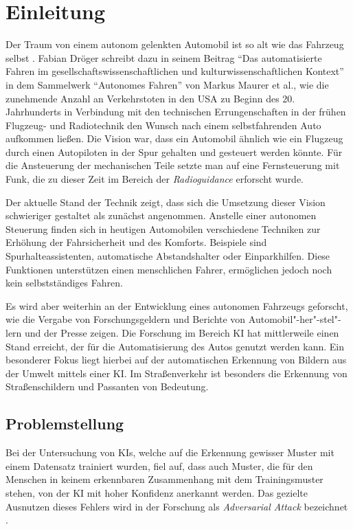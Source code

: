 \chapter{Einleitung}
\label{cha:Einleitung}
\setlength{\epigraphwidth}{4in}

Der Traum von einem autonom gelenkten Automobil ist so alt wie das Fahrzeug selbst \cite{maurer_autonomes_2015}. Fabian Dröger schreibt dazu in seinem Beitrag "`Das automatisierte Fahren im gesellschaftswissenschaftlichen und kulturwissenschaftlichen Kontext"' in dem Sammelwerk "`Autonomes Fahren"' von Markus Maurer et al., wie die zunehmende Anzahl an Verkehrstoten in den USA zu Beginn des 20. Jahrhunderts in Verbindung mit den technischen Errungenschaften in der frühen Flugzeug- und Radiotechnik den Wunsch nach einem selbstfahrenden Auto aufkommen ließen. Die Vision war, dass ein Automobil ähnlich wie ein Flugzeug durch einen Autopiloten in der Spur gehalten und gesteuert werden könnte. Für die Ansteuerung der mechanischen Teile setzte man auf eine Fernsteuerung mit Funk, die zu dieser Zeit im Bereich der \emph{Radioguidance} erforscht wurde.

Der aktuelle Stand der Technik zeigt, dass sich die Umsetzung dieser Vision schwieriger gestaltet als zunächst angenommen. Anstelle einer autonomen Steuerung finden sich in heutigen Automobilen verschiedene Techniken zur Erhöhung der Fahrsicherheit und des Komforts. Beispiele sind Spurhalteassistenten, automatische Abstandshalter oder Einparkhilfen. Diese Funktionen unterstützen einen menschlichen Fahrer, ermöglichen jedoch noch kein selbstständiges Fahren.

Es wird aber weiterhin an der Entwicklung eines autonomen Fahrzeugs geforscht, wie die Vergabe von Forschungsgeldern \cite{bmbf-internetredaktion_auto_nodate} und Berichte von Automobil"-her"-stel"-lern \cite{bmw_autonomes_nodate} und der Presse \cite{efler_autonomes_2018} zeigen. Die Forschung im Bereich \ac{KI} hat mittlerweile einen Stand erreicht, der für die Automatisierung des Autos genutzt werden kann. Ein besonderer Fokus liegt hierbei auf der automatischen Erkennung von Bildern aus der Umwelt mittels einer \ac{KI}. Im Straßenverkehr ist besonders die Erkennung von Straßenschildern und Passanten von Bedeutung.


\section{Problemstellung}
\label{sec:Problemstellung}
Bei der Untersuchung von \acp{KI}, welche auf die Erkennung gewisser Muster mit einem Datensatz trainiert wurden, fiel auf, dass auch Muster, die für den Menschen in keinem erkennbaren Zusammenhang mit dem Trainingsmuster stehen, von der \ac{KI} mit hoher Konfidenz anerkannt werden. Das gezielte Ausnutzen dieses Fehlers wird in der Forschung als \textit{Adversarial Attack} bezeichnet \cite{DBLP:journals/corr/HuangPGDA17}.

